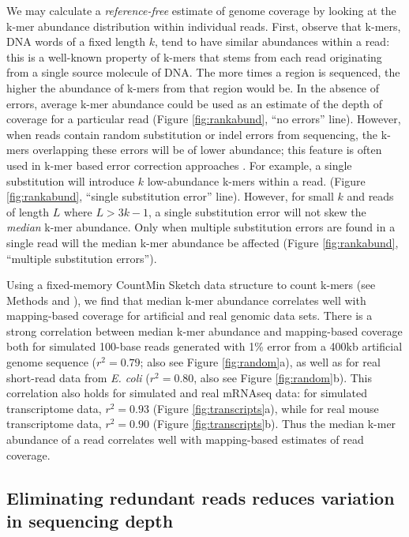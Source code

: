 \documentclass[10pt]{article}
\begin{document}
We may calculate a {\em reference-free} estimate of genome coverage by
looking at the k-mer abundance distribution within individual reads.
First, observe that k-mers, DNA words of a fixed length $k$, tend to
have similar abundances within a read: this is a well-known property
of k-mers that stems from each read originating from a single source
molecule of DNA.  The more times a region is sequenced, the higher the
abundance of k-mers from that region would be.  In the absence of
errors, average k-mer abundance could be used as an estimate of the
depth of coverage for a particular read (Figure \ref{fig:rankabund},
``no errors'' line).  However, when reads contain random substitution
or indel errors from sequencing, the k-mers overlapping these errors
will be of lower abundance; this feature is often used in k-mer based
error correction approaches \cite{pubmed21114842}.  For example, a
single substitution will introduce $k$ low-abundance k-mers within a
read.  (Figure \ref{fig:rankabund}, ``single substitution error''
line).  However, for small $k$ and reads of length $L$ where $L >
3k-1$, a single substitution error will not skew the {\em median}
k-mer abundance.  Only when multiple substitution errors are found in
a single read will the median k-mer abundance be affected (Figure
\ref{fig:rankabund}, ``multiple substitution errors'').

Using a fixed-memory CountMin Sketch data structure to count k-mers
(see Methods and \cite{countminsketch}), we find that median k-mer
abundance correlates well with mapping-based coverage for artificial
and real genomic data sets.  There is a strong correlation between
median k-mer abundance and mapping-based coverage both for simulated
100-base reads generated with 1\% error from a 400kb artificial genome
sequence ($r^2 = 0.79$; also see Figure \ref{fig:random}a), as well as
for real short-read data from {\em E. coli} ($r^2 = 0.80$, also see
Figure \ref{fig:random}b).  This correlation also holds for simulated
and real mRNAseq data: for simulated transcriptome data, $r^2 = 0.93$
(Figure \ref{fig:transcripts}a), while for real mouse transcriptome
data, $r^2 = 0.90$ (Figure \ref{fig:transcripts}b).
Thus the median k-mer abundance of a read correlates
well with mapping-based estimates of read coverage.


\subsection*{Eliminating redundant reads reduces variation in sequencing depth}
\end{document}
